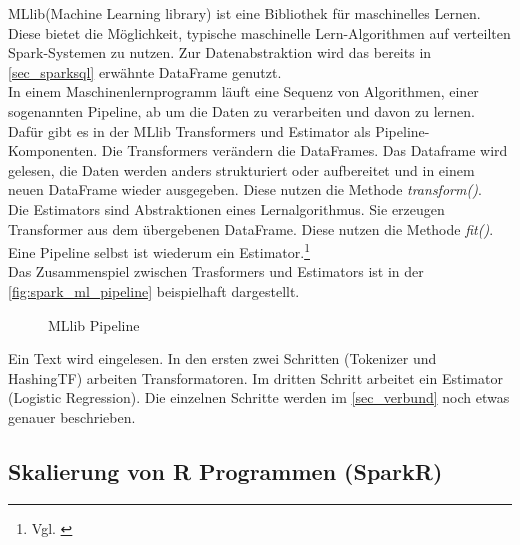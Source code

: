 MLlib(Machine Learning library) ist eine Bibliothek für maschinelles Lernen. Diese bietet die Möglichkeit, typische maschinelle Lern-Algorithmen auf verteilten Spark-Systemen zu nutzen. Zur Datenabstraktion wird das bereits in \ref{sec_sparksql} erwähnte DataFrame genutzt.  \\

\noindent
In einem Maschinenlernprogramm läuft eine Sequenz von Algorithmen, einer sogenannten Pipeline, ab um die Daten zu verarbeiten und davon zu lernen. 
Dafür gibt es in der MLlib Transformers und Estimator als Pipeline-Komponenten.
Die Transformers verändern die DataFrames. Das Dataframe wird gelesen, die Daten werden anders strukturiert oder aufbereitet und in einem neuen DataFrame wieder ausgegeben. Diese nutzen die Methode \textsl{transform()}.\\
Die Estimators sind Abstraktionen eines Lernalgorithmus. Sie erzeugen Transformer aus dem übergebenen DataFrame. Diese nutzen die Methode \textsl{fit()}.
Eine Pipeline selbst ist wiederum ein Estimator.\footnote{Vgl. \cite{AAWS15}} \\

\noindent
Das Zusammenspiel zwischen Trasformers und Estimators ist in der \autoref{fig:spark_ml_pipeline} beispielhaft dargestellt. \\
 
\begin{figure}[h]
  \centering
  \caption{MLlib Pipeline \cite{SPMLLIB}}\label{fig:spark_ml_pipeline}
\end{figure}

\noindent
Ein Text wird eingelesen. In den ersten zwei Schritten (Tokenizer und HashingTF) arbeiten Transformatoren. Im dritten Schritt arbeitet ein Estimator (Logistic Regression). Die einzelnen Schritte werden im \autoref{sec_verbund} noch etwas genauer beschrieben.





\newpage
\subsection{Skalierung von R Programmen (SparkR)}\label{sec_sparkr}

